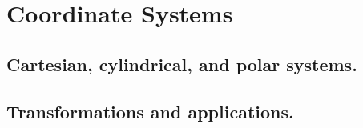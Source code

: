 \chapter{Coordinate Systems}\label{coord}
\section{Cartesian, cylindrical, and polar systems.}\label{coord:systems}
\section{Transformations and applications.}\label{coord:trans}